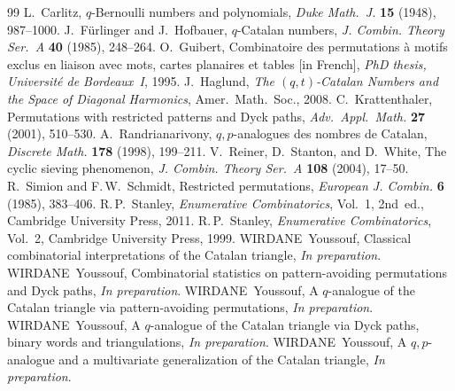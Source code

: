 \documentclass[12pt,a4paper,reqno]{amsart}
\theoremstyle{plain}
\theoremstyle{definition}
\begin{document}
\begin{thebibliography}{99}
 L.~Carlitz, $q$-Bernoulli numbers and polynomials,
\textit{Duke Math.\ J.} \textbf{15} (1948), 987--1000.
 J.~F{\"u}rlinger and J.~Hofbauer, $q$-Catalan numbers,
\textit{J. Combin. Theory Ser.~A} \textbf{40} (1985), 248--264.
 O.~Guibert,
Combinatoire des permutations \`a motifs exclus en liaison
avec mots, cartes planaires et tables [in French],
\textit{PhD thesis, Universit\'e de Bordeaux~I}, 1995.
 J.~Haglund,
\textit{The $(q,t)$-Catalan Numbers and the Space of Diagonal Harmonics},
Amer.\ Math.\ Soc., 2008.
 C.~Krattenthaler,
Permutations with restricted patterns and Dyck paths,
\textit{Adv.\ Appl.\ Math.} \textbf{27} (2001), 510--530.
 A.~Randrianarivony,
$q,p$-analogues des nombres de Catalan,
\textit{Discrete Math.} \textbf{178} (1998), 199--211.
 V.~Reiner, D.~Stanton, and D.~White,
The cyclic sieving phenomenon,
\textit{J. Combin. Theory Ser.~A} \textbf{108} (2004), 17--50.
 R.~Simion and F.\,W.~Schmidt, Restricted permutations,
\textit{European J. Combin.} \textbf{6} (1985), 383--406.
 R.\,P.~Stanley,
\textit{Enumerative Combinatorics}, Vol.~1, 2nd~ed.,
Cambridge University Press, 2011.
 R.\,P.~Stanley,
\textit{Enumerative Combinatorics}, Vol.~2,
Cambridge University Press, 1999.
 WIRDANE~Youssouf,
Classical combinatorial interpretations of the Catalan triangle,
\textit{In preparation}.
 WIRDANE~Youssouf,
Combinatorial statistics on pattern-avoiding permutations and Dyck paths,
\textit{In preparation}.
 WIRDANE~Youssouf,
A $q$-analogue of the Catalan triangle via pattern-avoiding permutations,
\textit{In preparation}.
 WIRDANE~Youssouf,
A $q$-analogue of the Catalan triangle via Dyck paths, binary words
and triangulations, \textit{In preparation}.
 WIRDANE~Youssouf,
A $q{,}p$-analogue and a multivariate generalization of the Catalan triangle,
\textit{In preparation}.
\end{thebibliography}
\end{document}
